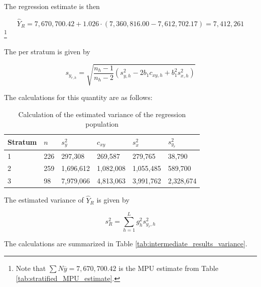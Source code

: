 The regression estimate is then

\begin{equation*}
	\hat{Y}_R = 7,670,700.42 + 1.026 \cdot (7,360,816.00 - 7,612,702.17) = 7,412,261
\end{equation*}\footnote{Note that $\sum{N \overline{y}} = 7,670,700.42$ is the MPU estimate from Table \ref{tab:stratified_MPU_estimate}.}

The  per stratum is given by

\begin{equation}
s_{y_{r, h}} = \sqrt{\frac{n_h - 1}{n_h - 2}(s_{y, h}^2 - 2 b_1 c_{xy, h} + b_1^2 s_{x, h}^2)}
\label{eq:standard_error_regression_population_stratum}
\end{equation}

The calculations for this quantity are as follows:

\begin{table}[htbp]
\begin{tabularx}{\textwidth}{X Y Y Y Y Y}
\toprule
\parbox[t]{1.4 cm}{Stratum} &
$n$ &
$s_y^2$ &
$c_{xy}$ &
$s_x^2$ &
$s_{y_r}^2$ \\

\midrule

1 & 226 &   297,308 &   269,587 &   279,765 &    38,790 \\
2 & 259 & 1,696,612 & 1,082,008 & 1,055,485 &   589,700 \\
3 &  98 & 7,979,066 & 4,813,063 & 3,991,762 & 2,328,674 \\

\bottomrule
\end{tabularx}
\caption{Calculation of the estimated variance of the regression population}
\label{tab:standard_error_regression}
\end{table}

\bigskip
The estimated variance of $\hat{Y}_{R}$ is given by

\begin{equation}
s^2_{R} = \sum_{h = 1}^{L}g_h^2 s_{y_r,h}^2
\label{eq:estimated_variance_regression}
\end{equation}

The calculations are summarized in Table \ref{tab:intermediate_results_variance}.

